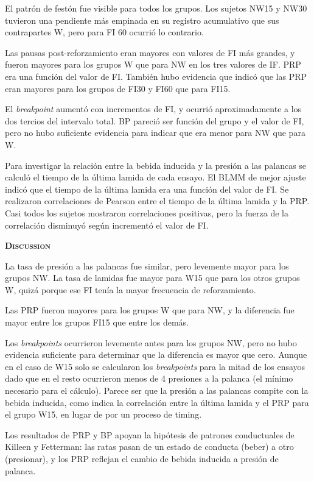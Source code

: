 \documentclass[a4paper,12pt]{article}
\begin{document}
El patrón de festón fue visible para todos los grupos. Los sujetos NW15 y NW30 tuvieron una pendiente más empinada en su registro acumulativo que sus contrapartes W, pero para FI 60 ocurrió lo contrario.

Las pausas post-reforzamiento eran mayores con valores de FI más grandes, y fueron mayores para los grupos W que para NW en los tres valores de IF. PRP era una función del valor de FI. También hubo evidencia que indicó que las PRP eran mayores para los grupos de FI30 y FI60 que para FI15. 

El {\itshape breakpoint} aumentó con incrementos de FI, y ocurrió aproximadamente a los dos tercios del intervalo total. BP pareció ser función del grupo y el valor de FI, pero no hubo suficiente evidencia para indicar que era menor para NW que para W.

Para investigar la relación entre la bebida inducida y la presión a las palancas se calculó el tiempo de la última lamida de cada ensayo. El BLMM de mejor ajuste indicó que el tiempo de la última lamida era una función del valor de FI. Se realizaron correlaciones de Pearson entre el tiempo de la última lamida y la PRP. Casi todos los sujetos mostraron correlaciones positivas, pero la fuerza de la correlación disminuyó según incrementó el valor de FI. 

{\scshape\bfseries Discussion}

La tasa de presión a las palancas fue similar, pero levemente mayor para los grupos NW. La tasa de lamidas fue mayor para W15 que para los otros grupos W, quizá porque ese FI tenía la mayor frecuencia de reforzamiento.

Las PRP fueron mayores para los grupos W que para NW, y la diferencia fue mayor entre los grupos FI15 que entre los demás.

Los {\itshape breakpoints} ocurrieron levemente antes para los grupos NW, pero no hubo evidencia suficiente para determinar que la diferencia es mayor que cero. Aunque en el caso de W15 solo se calcularon los {\itshape breakpoints} para la mitad de los ensayos dado que en el resto ocurrieron menos de 4 presiones a la palanca (el mínimo necesario para el cálculo). Parece ser que la presión a las palancas compite con la bebida inducida, como indica la correlación entre la última lamida y el PRP para el grupo W15, en lugar de por un proceso de timing.

Los resultados de PRP y BP apoyan la hipótesis de patrones conductuales de Killeen y Fetterman: las ratas pasan de un estado de conducta (beber) a otro (presionar), y los PRP reflejan el cambio de bebida inducida a presión de palanca.
\end{document}

